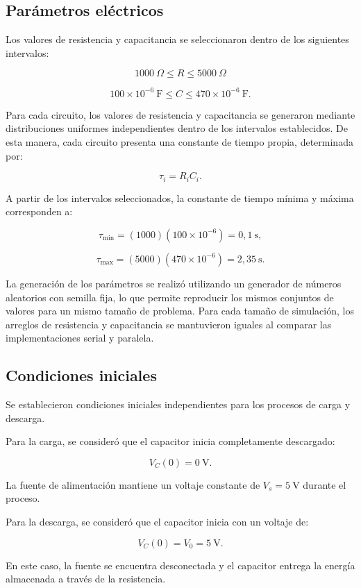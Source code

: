 \documentclass[11pt,a4paper]{article}
\begin{document}
\subsection{Parámetros eléctricos}

Los valores de resistencia y capacitancia se seleccionaron
dentro de los siguientes intervalos:

\[
1000\ \Omega \leq R \leq 5000\ \Omega
\]

\[
100\times10^{-6}\ \text{F}
\leq C \leq
470\times10^{-6}\ \text{F}.
\]

Para cada circuito, los valores de resistencia y capacitancia
se generaron mediante distribuciones uniformes independientes
dentro de los intervalos establecidos. De esta manera, cada
circuito presenta una constante de tiempo propia, determinada
por:

\[
\tau_i=R_iC_i.
\]

A partir de los intervalos seleccionados, la constante de
tiempo mínima y máxima corresponden a:

\[
\tau_{\min}=(1000)(100\times10^{-6})
=0,1\ \text{s},
\]

\[
\tau_{\max}=(5000)(470\times10^{-6})
=2,35\ \text{s}.
\]

La generación de los parámetros se realizó utilizando un
generador de números aleatorios con semilla fija, lo que
permite reproducir los mismos conjuntos de valores para un
mismo tamaño de problema. Para cada tamaño de simulación,
los arreglos de resistencia y capacitancia se mantuvieron
iguales al comparar las implementaciones serial y paralela.

\subsection{Condiciones iniciales}

Se establecieron condiciones iniciales independientes para
los procesos de carga y descarga.

Para la carga, se consideró que el capacitor inicia
completamente descargado:

\[
V_C(0)=0\ \text{V}.
\]

La fuente de alimentación mantiene un voltaje constante de
$V_s=5\ \text{V}$ durante el proceso.

Para la descarga, se consideró que el capacitor inicia con
un voltaje de:

\[
V_C(0)=V_0=5\ \text{V}.
\]

En este caso, la fuente se encuentra desconectada y el
capacitor entrega la energía almacenada a través de la
resistencia.
\end{document}
